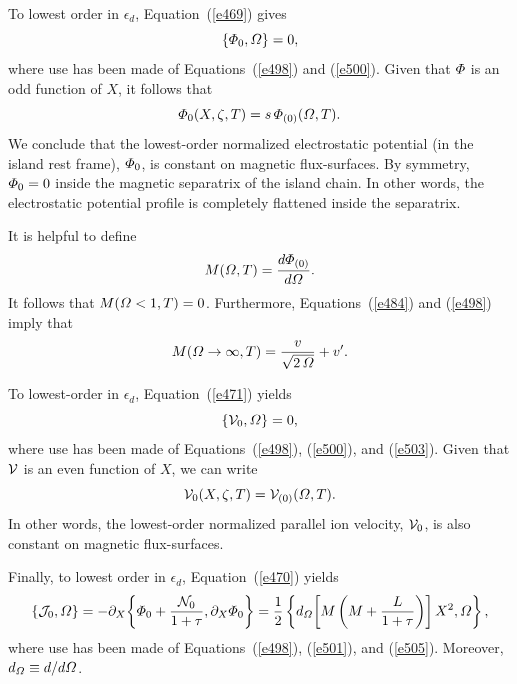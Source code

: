 \documentclass[notitlepage,12pt]{article}
\begin{document}
To lowest order in $\epsilon_d$, Equation~(\ref{e469}) gives
\begin{equation}
\{{\mit\Phi}_0,{\mit\Omega}\}=0,
\end{equation}
where use has been made of Equations~(\ref{e498}) and (\ref{e500}). Given that
${\mit\Phi}$ is an odd function of $X$, it follows that 
\begin{equation}\label{e503}
{\mit\Phi}_0(X,\zeta,T) = s\, {\mit\Phi}_{(0)}({\mit\Omega},T).
\end{equation}
 We conclude that the lowest-order normalized
electrostatic potential (in the island rest frame), ${\mit\Phi}_{0}$, is  constant on magnetic flux-surfaces. 
By symmetry, ${\mit\Phi}_{0}=0$ inside the magnetic separatrix of the island chain. In other words, the electrostatic
potential profile is  completely flattened inside the separatrix. 

It is helpful to define
\begin{equation}\label{e505}
M({\mit\Omega},T) = \frac{d{\mit\Phi}_{(0)}}{d{\mit\Omega}}.
\end{equation}
It follows that $M({\mit\Omega}<1,T)=0$. Furthermore, Equations~(\ref{e484}) and (\ref{e498}) imply that
\begin{equation}\label{e506}
M({\mit\Omega}\rightarrow\infty,T) = \frac{v}{\sqrt{2\,{\mit\Omega}}}+ v'.
\end{equation}

To lowest-order in $\epsilon_d$, Equation~(\ref{e471}) yields
\begin{equation}
\{{\cal V}_0,{\mit\Omega}\} = 0,
\end{equation}
where use has been made of Equations~(\ref{e498}), (\ref{e500}), and (\ref{e503}). Given that
${\cal V}$ is an even function of $X$, we can write
\begin{equation}\label{e508}
{\cal V}_0(X,\zeta,T) = {\cal V}_{(0)}({\mit\Omega},T).
\end{equation}
In other words, the lowest-order normalized parallel ion velocity, ${\cal V}_0$, is also constant on
magnetic flux-surfaces. 

Finally, to lowest order in $\epsilon_d$, Equation~(\ref{e470}) yields
\begin{equation}\label{e509}
\{{\cal J}_0,{\mit\Omega}\} = -\partial_X\!\left\{{\mit\Phi}_0+\frac{{\cal N}_0}{1+\tau}, \partial_X {\mit\Phi}_0\right\}=
\frac{1}{2}\left\{d_{\mit\Omega}\!\left[M\left(M+\frac{L}{1+\tau}\right)\right]X^2, {\mit\Omega}\right\},
\end{equation}
where use has been made of Equations~(\ref{e498}), (\ref{e501}), and (\ref{e505}). Moreover, $d_{\mit\Omega}\equiv
d/d{\mit\Omega}$. 
\end{document}
